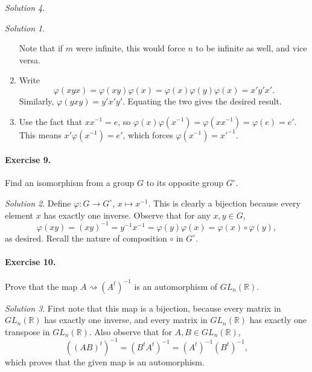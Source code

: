 \documentclass[11pt]{report}
\def\R{\mathbb{R}}
\theoremstyle{remark}
\newtheorem*{solution}{Solution}
\begin{document}
\begin{solution}
\begin{solution}
\begin{enumerate}
            Note that if $m$ were infinite, this would force $n$ to be infinite as
            well, and vice versa.

            \item Write \[
                \varphi(xyx) = \varphi(xy)\varphi(x) =
                \varphi(x)\varphi(y)\varphi(x) = x'y'x'.
            \] Similarly, $\varphi(yxy) = y'x'y'$. Equating the two gives the
            desired result.

            \item Use the fact that $x x^{-1} = e$, so $\varphi(x)\varphi(x^{-1}) =
            \varphi(x x^{-1}) = \varphi(e) = e'$. This means $x' \varphi(x^{-1}) =
            e'$, which forces $\varphi(x^{-1}) = x'^{-1}$.
        \end{enumerate}
    \end{solution}
    

    
    \paragraph{Exercise 9.} Find an isomorphism from a group $G$ to its opposite
    group $G^\circ$.
    \begin{solution}
        Define $\varphi\colon G \to G^\circ$, $x \mapsto x^{-1}$. This is clearly a
        bijection because every element $x$ has exactly one inverse. Observe that 
        for any $x, y \in G$, \[
            \varphi(xy) = (xy)^{-1}= y^{-1}x^{-1} = \varphi(y)\varphi(x) =
            \varphi(x)\circ \varphi(y),
        \] as desired. Recall the nature of composition $\circ$ in $G^\circ$.
    \end{solution}
    
    \paragraph{Exercise 10.} Prove that the map $A \rightsquigarrow (A^t)^{-1}$ is
    an automorphism of $GL_n(\R)$.
    \begin{solution}
        First note that this map is a bijection, because every matrix in $GL_n(\R)$
        has exactly one inverse, and every matrix in $GL_n(\R)$ has exactly one
        transpose in $GL_n(\R)$. Also observe that for $A, B \in GL_n(\R)$, \[
            ((AB)^t)^{-1} = (B^tA^t)^{-1} = (A^t)^{-1}(B^t)^{-1},
        \] which proves that the given map is an automorphism.
    \end{solution}


\end{solution}
\end{document}
